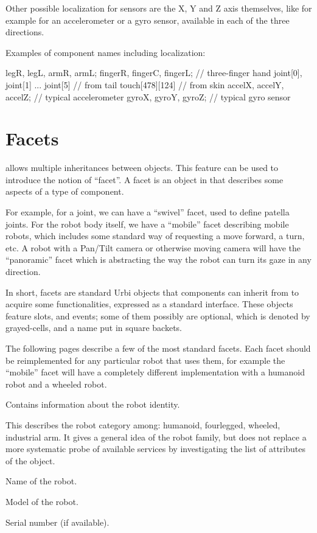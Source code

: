 Other possible localization for sensors are the X, Y and Z axis
themselves, like for example for an accelerometer or a gyro sensor,
available in each of the three directions.


Examples of component names including localization:

\begin{urbifixme}
legR, legL, armR, armL;
fingerR, fingerC, fingerL;      // three-finger hand
joint[0], joint[1] ... joint[5] // from tail
touch[478][124]                 // from skin
accelX, accelY, accelZ;         // typical accelerometer
gyroX, gyroY, gyroZ;            // typical gyro sensor
\end{urbifixme}

\section{Facets}
\label{sec:facet}

\urbi allows multiple inheritances between objects. This feature can be
used to introduce the notion of ``facet''. A facet is an object in \urbi
that describes some aspects of a type of component.

For example, for a joint, we can have a ``swivel'' facet, used to define
patella joints. For the robot body itself, we have a ``mobile'' facet
describing mobile robots, which includes some standard way of
requesting a move forward, a turn, etc. A robot with a Pan/Tilt camera
or otherwise moving camera will have the ``panoramic'' facet which is
abstracting the way the robot can turn its gaze in any direction.

In short, facets are standard Urbi objects that components can inherit
from to acquire some functionalities, expressed as a standard
interface.  These objects feature slots, and events; some of them
possibly are optional, which is denoted by grayed-cells, and a name
put in square backets.

The following pages describe a few of the most standard facets. Each
facet should be reimplemented for any particular robot that uses them,
for example the ``mobile'' facet will have a completely different
implementation with a humanoid robot and a wheeled robot.


Contains information about the robot identity.

\begin{slots}
  {
    This describes the robot category among: humanoid, fourlegged,
    wheeled, industrial arm. It gives a general idea of the robot
    family, but does not replace a more systematic probe of available
    services by investigating the list of attributes of the object.
  }

  {%
    Name of the robot.%
  }

  {%
    Model of the robot.%
  }

  {%
    Serial number (if available).%
  }

\end{slots}


